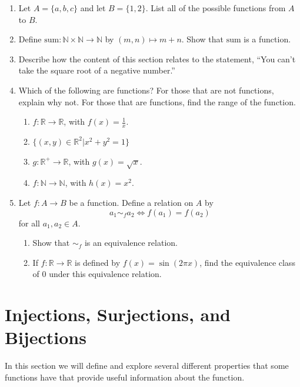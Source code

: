 \documentclass[
]{book}
\theoremstyle{definition}
\theoremstyle{definition}
\theoremstyle{definition}
\theoremstyle{remark}
\begin{document}
\begin{enumerate}
\def\labelenumi{\arabic{enumi}.}
\item
  Let \(A=\{a,b,c\}\) and let \(B=\{1,2\}\). List all of the possible functions from \(A\) to \(B\).
\item
  Define \(\mathrm{sum}:\mathbb{N}\times \mathbb{N} \rightarrow \mathbb{N}\) by \((m,n) \mapsto m+n\). Show that \(\mathrm{sum}\) is a function.
\item
  Describe how the content of this section relates to the statement, ``You can't take the square root of a negative number.''
\item
  Which of the following are functions? For those that are not functions, explain why not. For those that are functions, find the range of the function.

  \begin{enumerate}
  \def\labelenumii{\alph{enumii}.}
  \item
    \(f:\mathbb{R} \rightarrow \mathbb{R}\), with \(f(x)=\frac{1}{x}\).
  \item
    \(\{(x,y)\in \mathbb{R}^2\vert x^2+y^2=1\}\)
  \item
    \(g:\mathbb{R}^+ \rightarrow \mathbb{R}\), with \(g(x)=\sqrt{x}\).
  \item
    \(f:\mathbb{N} \rightarrow \mathbb{N}\), with \(h(x)=x^2\).
  \end{enumerate}
\item
  Let \(f:A\rightarrow B\) be a function. Define a relation on \(A\) by \[a_1 \sim_f a_2 \Leftrightarrow f(a_1)=f(a_2)\] for all \(a_1,a_2\in A\).

  \begin{enumerate}
  \def\labelenumii{\alph{enumii}.}
  \item
    Show that \(\sim_f\) is an equivalence relation.
  \item
    If \(f:\mathbb{R} \rightarrow \mathbb{R}\) is defined by \(f(x)=\sin(2\pi x)\), find the equivalence class of \(0\) under this equivalence relation.
  \end{enumerate}
\end{enumerate}

\hypertarget{sec:Bijection}{%
\section{Injections, Surjections, and Bijections}\label{sec:Bijection}}

In this section we will define and explore several different properties that some functions have that provide useful information about the function.
\end{document}
